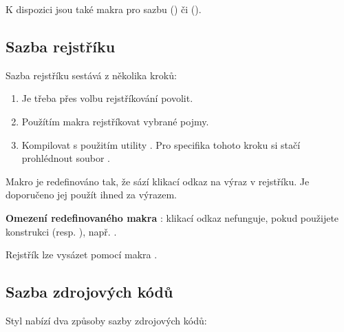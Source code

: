 \documentclass[
  program=itk,
  biblatex,
  language=czech,
  figures=false,
  glossaries,
  index
]{kidiplom}
\begin{document}
K dispozici jsou také makra pro sazbu \csharp{} () či \cpp{} ().


\subsection{Sazba rejstříku}
Sazba rejstříku sestává z několika kroků:

\begin{enumerate}
\item Je třeba přes volbu  rejstříkování povolit.
\item Použítím makra  rejstříkovat vybrané pojmy.
\item Kompilovat s použitím utility . Pro specifika tohoto kroku si stačí prohlédnout soubor .
\end{enumerate}

Makro  je redefinováno tak, že sází klikací odkaz na výraz v rejstříku. Je doporučeno jej použít ihned za výrazem.

\textbf{Omezení redefinovaného makra }: klikací odkaz nefunguje, pokud použijete konstrukci  (resp. ), např. .

Rejstřík lze vysázet pomocí makra .

\subsection{Sazba zdrojových kódů}
Styl nabízí dva způsoby sazby zdrojových kódů:
\end{document}
